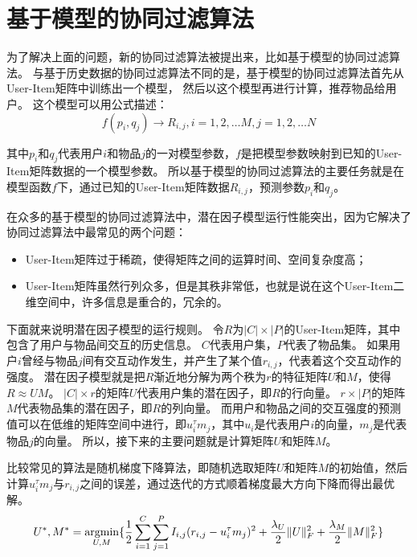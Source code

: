 \section{基于模型的协同过滤算法}
为了解决上面的问题，新的协同过滤算法被提出来，比如基于模型的协同过滤算法。
与基于历史数据的协同过滤算法不同的是，基于模型的协同过滤算法首先从User-Item矩阵中训练出一个模型，
然后以这个模型再进行计算，推荐物品给用户。
这个模型可以用公式描述：
\begin{equation}
f(p_i,q_j)\rightarrow R_{i,j},i=1,2,\dots M, j=1,2,\dots N
\end{equation}

其中$p_i$和$q_j$代表用户$i$和物品$j$的一对模型参数，$f$是把模型参数映射到已知的User-Item矩阵数据的一个模型参数。
所以基于模型的协同过滤算法的主要任务就是在模型函数$f$下，通过已知的User-Item矩阵数据$R_{i,j}$，预测参数$p_i$和$q_j$。

在众多的基于模型的协同过滤算法中，潜在因子模型运行性能突出，因为它解决了协同过滤算法中最常见的两个问题：
\begin{itemize}
\item User-Item矩阵过于稀疏，使得矩阵之间的运算时间、空间复杂度高；
\item User-Item矩阵虽然行列众多，但是其秩非常低，也就是说在这个User-Item二维空间中，许多信息是重合的，冗余的。
\end{itemize}

下面就来说明潜在因子模型的运行规则。
令$R$为$|C|\times|P|$的User-Item矩阵，其中包含了用户与物品间交互的历史信息。
$C$代表用户集，$P$代表了物品集。
如果用户$i$曾经与物品$j$间有交互动作发生，并产生了某个值$r_{i,j}$，代表着这个交互动作的强度。
潜在因子模型就是把$R$渐近地分解为两个秩为$r$的特征矩阵$U$和$M$，使得$R\approx UM$。
$|C|\times r$的矩阵$U$代表用户集的潜在因子，即$R$的行向量。
$r\times |P|$的矩阵$M$代表物品集的潜在因子，即$R$的列向量。
而用户和物品之间的交互强度的预测值可以在低维的矩阵空间中进行，即$u_i^\tau m_j$，其中$u_i$是代表用户$i$的向量，$m_j$是代表物品$j$的向量。
所以，接下来的主要问题就是计算矩阵$U$和矩阵$M$。

比较常见的算法是随机梯度下降算法，即随机选取矩阵$U$和矩阵$M$的初始值，然后计算$u_i^\tau m_j$与$r_{i,j}$之间的误差，通过迭代的方式顺着梯度最大方向下降而得出最优解。
\begin{equation}
U^*,M^* = \mathop{\operatorname*{argmin}}_{U,M} \{\frac{1}{2} \sum_{i=1}^C \sum_{j=1}^P I_{i,j}(r_{i,j}-u_i^{\tau} m_j)^2 + \frac{\lambda_U}{2}\lVert U\rVert_F^2 +\frac{\lambda_M}{2}\lVert M\rVert_F^2\}
\end{equation}

